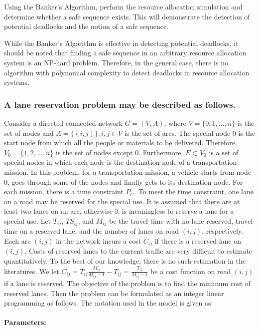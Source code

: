 \documentclass{article}
\begin{document}
Using the Banker's Algorithm, perform the resource allocation simulation and determine whether a safe sequence exists. This will demonstrate the detection of potential deadlocks and the notion of a safe sequence.

While the Banker's Algorithm is effective in detecting potential deadlocks, it should be noted that finding a safe sequence in an arbitrary resource allocation system is an NP-hard problem. Therefore, in the general case, there is no algorithm with polynomial complexity to detect deadlocks in resource allocation systems.  


\subsubsection{A lane reservation problem may be described as follows. }

Consider a directed connected network $G = (V, A)$, where $V = \{0, 1, …, n\}$ is the set of nodes and $A = \{(i, j)\}, i, j \in V$ is the set of arcs. The special node 0 is the start node from which all the people or materials to be delivered. Therefore, $V_0 = \{1, 2, …, n\}$ is the set of nodes except 0. Furthermore, $E \subset  V_0$ is a set of special nodes in which each node is the destination node of a transportation mission. In this problem, for a transportation mission, a vehicle starts from node 0, goes through some of the nodes and finally gets to its destination node. For each mission, there is a time constraint $P_C$. To meet the time constraint, one lane on a road may be reserved for the special use. It is assumed that there are at least two lanes on an arc, otherwise it is meaningless to reserve a lane for a special use. Let $T_{ij}$, $TS_{ij}$, and $M_{ij}$ be the travel time with no lane reserved, travel time on a reserved lane, and the number of lanes on road $(i, j)$, respectively. Each arc $(i, j)$ in the network incurs a cost $C_{ij}$ if there is a reserved lane on $(i, j)$. Costs of reserved lanes to the current traffic are very difficult to estimate quantitatively. To the best of our knowledge, there is no such estimation in the literatures. We let $C_{ij} = T_{ij}\frac{M_{ij}}{M_{ij}-1} - T_{ij} = \frac{T_{ij}}{M_{ij}-1}$  be a cost function on road $(i, j)$ if a lane is reserved. The objective of the problem is to find the minimum cost of reserved lanes. Then the problem can be formulated as an integer linear programming as follows. The notation used in the model is given as:

\paragraph{Parameters:}
\end{document}
